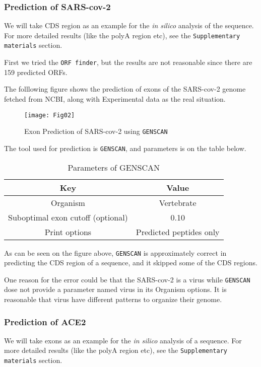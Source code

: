 \documentclass[en,black,10pt,normal]{elegantnote}
\begin{document}
\subsubsection{Prediction of SARS-cov-2}
We will take CDS region as an example for the \textit{in silico} analysis of the sequence.
For more detailed results (like the polyA region etc), see the \texttt{Supplementary materials} section.

First we tried the \texttt{ORF finder}, but the results are not reasonable since there are 159 predicted ORFs.

The folllowing figure shows the prediction of exons of the SARS-cov-2 genome fetched from NCBI, 
along with Experimental data as the real situation. 

\begin{figure}[H]
    \centering
    \texttt{[image: Fig02]}
    \caption{Exon Prediction of SARS-cov-2 using \texttt{GENSCAN}}
    \label{SARS}
\end{figure}

The tool used for prediction is \texttt{GENSCAN}, and parameters is on the table below.

\begin{table}[H]
    \caption{Parameters of GENSCAN}
    \centering
    \begin{tabular}{cc}
        \toprule
        Key&Value\\
        \midrule
        Organism&Vertebrate\\
        Suboptimal exon cutoff (optional)&0.10\\
        Print options&Predicted peptides only\\
        \bottomrule
    \end{tabular}
\end{table}

As can be seen on the figure above, \texttt{GENSCAN} is approximately correct in
predicting the CDS region of a sequence, and it skipped some of the CDS regions.

One reason for the error could be that the SARS-cov-2 is a virus while \texttt{GENSCAN}
dose not provide a parameter named virus in its Organism options. 
It is reasonable that virus have different patterns to organize their genome.



\subsubsection{Prediction of ACE2}
We will take exons as an example for the \textit{in silico} analysis of a sequence.
For more detailed results (like the polyA region etc), see the \texttt{Supplementary materials} section.
\end{document}
